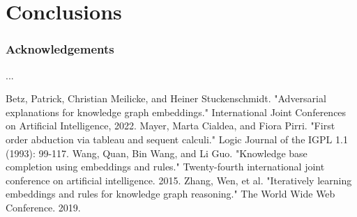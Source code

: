 \documentclass[runningheads]{llncs}
\begin{document}



\section{Conclusions}

%
%


\subsubsection{Acknowledgements} ...

%
%
%
% 
% 
%
\begin{thebibliography}{8}
Betz, Patrick, Christian Meilicke, and Heiner Stuckenschmidt. "Adversarial explanations for knowledge graph embeddings." International Joint Conferences on Artificial Intelligence, 2022.
Mayer, Marta Cialdea, and Fiora Pirri. "First order abduction via tableau and sequent calculi." Logic Journal of the IGPL 1.1 (1993): 99-117.
Wang, Quan, Bin Wang, and Li Guo. "Knowledge base completion using embeddings and rules." Twenty-fourth international joint conference on artificial intelligence. 2015.
Zhang, Wen, et al. "Iteratively learning embeddings and rules for knowledge graph reasoning." The World Wide Web Conference. 2019.


\end{thebibliography}
\end{document}
